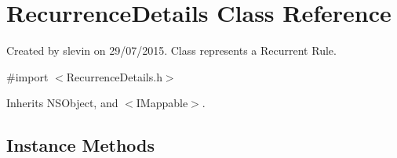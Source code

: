 \hypertarget{interface_recurrence_details}{}\section{Recurrence\+Details Class Reference}
\label{interface_recurrence_details}


Created by slevin on 29/07/2015. Class represents a Recurrent Rule.  




{\ttfamily \#import $<$Recurrence\+Details.\+h$>$}



Inherits N\+S\+Object, and $<$\+I\+Mappable$>$.

\subsection*{Instance Methods}
